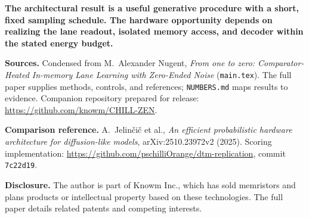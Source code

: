 \documentclass[11pt,letterpaper]{article}
\newcommand{\takeaway}[1]{\par\medskip\noindent\colorbox{pale}{\parbox{\dimexpr\linewidth-2\fboxsep\relax}{\vspace{5pt}\textbf{#1}\vspace{5pt}}}\par\medskip}
\begin{document}
\takeaway{The architectural result is a useful generative procedure with a short, fixed sampling schedule. The hardware opportunity depends on realizing the lane readout, isolated memory access, and decoder within the stated energy budget.}

{\small\raggedright
\textbf{Sources.} Condensed from M.\ Alexander Nugent, \emph{From one to zero: Comparator-Heated In-memory Lane Learning with Zero-Ended Noise} (\texttt{main.tex}). The full paper supplies methods, controls, and references; \texttt{NUMBERS.md} maps results to evidence. Companion repository prepared for release: \url{https://github.com/knowm/CHILL-ZEN}.

\textbf{Comparison reference.} A.\ Jelin\v{c}i\v{c} et al., \emph{An efficient probabilistic hardware architecture for diffusion-like models}, arXiv:2510.23972v2 (2025). Scoring implementation: \url{https://github.com/pschilliOrange/dtm-replication}, commit \texttt{7c22d19}.

\textbf{Disclosure.} The author is part of Knowm Inc., which has sold memristors and plans products or intellectual property based on these technologies. The full paper details related patents and competing interests.
\par}
\end{document}
